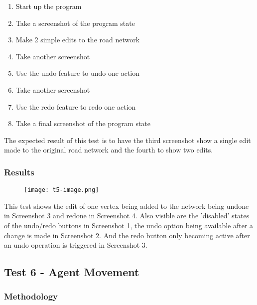             \begin{enumerate}
                \item Start up the program
                \item Take a screenshot of the program state
                \item Make 2 simple edits to the road network
                \item Take another screenshot
                \item Use the undo feature to undo one action
                \item Take another screenshot
                \item Use the redo feature to redo one action
                \item Take a final screenshot of the program state
            \end{enumerate}

            The expected result of this test is to have the third screenshot show a single edit made to the original road network and the fourth to show two edits.

        \subsubsection{Results}

            \begin{figure}[ht]
                \centering
                \texttt{[image: t5-image.png]}
                \caption{}
                \label{testing:t5-image}
            \end{figure}

            This test shows the edit of one vertex being added to the network being undone in Screenshot 3 and redone in Screenshot 4. Also visible are the 'disabled' states of the undo/redo buttons in Screenshot 1, the undo option being available after a change is made in Screenshot 2. And the redo button only becoming active after an undo operation is triggered in Screenshot 3.

    \subsection{Test 6 - Agent Movement}
    \label{testing:t6}

        \subsubsection{Methodology}

